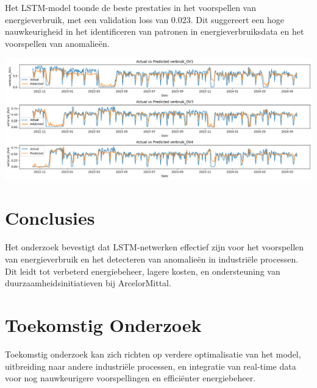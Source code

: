 \documentclass[a0,portrait]{hogent-poster}
\begin{document}
\begin{multicols}{2}
Het LSTM-model toonde de beste prestaties in het voorspellen van energieverbruik, met een validation loss van 0.023. Dit suggereert een hoge nauwkeurigheid in het identificeren van patronen in energieverbruiksdata en het voorspellen van anomalieën.

\begin{center}
  \captionsetup{type=figure}
  \includegraphics[width=1.0\linewidth]{./graphics/model_performance.png} 
\end{center}

\section{Conclusies}

Het onderzoek bevestigt dat LSTM-netwerken effectief zijn voor het voorspellen van energieverbruik en het detecteren van anomalieën in industriële processen. Dit leidt tot verbeterd energiebeheer, lagere kosten, en ondersteuning van duurzaamheidsinitiatieven bij ArcelorMittal.

\section{Toekomstig Onderzoek}

Toekomstig onderzoek kan zich richten op verdere optimalisatie van het model, uitbreiding naar andere industriële processen, en integratie van real-time data voor nog nauwkeurigere voorspellingen en efficiënter energiebeheer.

\end{multicols}
\end{document}
